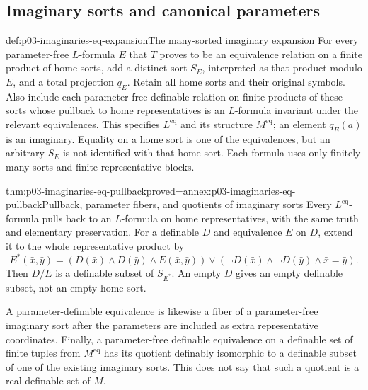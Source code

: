 \subsection{Imaginary sorts and canonical parameters}

\begin{hbdefinition}{def:p03-imaginaries-eq-expansion}{The many-sorted imaginary expansion}
For every parameter-free \(L\)-formula \(E\) that \(T\) proves to be
an equivalence relation on a finite product of home sorts, add a distinct sort
\(S_E\), interpreted as that product modulo \(E\), and a total
projection \(q_E\). Retain all home sorts and their original symbols.
Also include each parameter-free definable relation on finite products of these
sorts whose pullback to home representatives is an \(L\)-formula invariant
under the relevant equivalences. This specifies \(L^{\mathrm{eq}}\)
and its structure \(M^{\mathrm{eq}}\); an element \(q_E(\bar a)\)
is an imaginary. Equality on a home sort is one of the equivalences, but an
arbitrary \(S_E\) is not identified with that home sort.
Each formula uses only finitely many sorts and finite representative blocks.
\end{hbdefinition}

\begin{hbtheorem}{thm:p03-imaginaries-eq-pullback}{proved=annex:p03-imaginaries-eq-pullback}{Pullback, parameter fibers, and quotients of imaginary sorts}
Every \(L^{\mathrm{eq}}\)-formula pulls back to an \(L\)-formula on
home representatives, with the same truth and elementary preservation.
For a definable \(D\) and equivalence \(E\) on \(D\), extend it to
the whole representative product by
\[
 E^*(\bar x,\bar y)=
 (D(\bar x)\land D(\bar y)\land E(\bar x,\bar y))
 \lor(\neg D(\bar x)\land\neg D(\bar y)\land\bar x=\bar y).
\]
Then \(D/E\) is a definable subset of \(S_{E^*}\). An empty \(D\)
gives an empty definable subset, not an empty home sort.

A parameter-definable equivalence is likewise a fiber of a parameter-free
imaginary sort after the parameters are included as extra representative
coordinates. Finally, a parameter-free definable equivalence on a definable
set of finite tuples from \(M^{\mathrm{eq}}\) has its quotient
definably isomorphic to a definable subset of one of the existing imaginary
sorts. This does not say that such a quotient is a real definable set of \(M\).
\end{hbtheorem}


